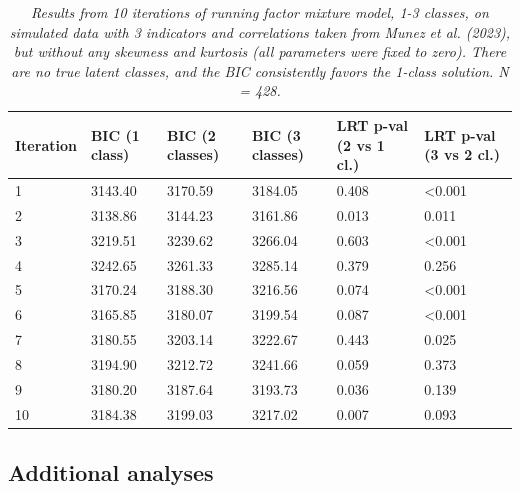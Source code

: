 \documentclass[letterpaper,11pt]{article}
\begin{document}
\begin{table}[htbp]
    \centering
    \label{tab:iterationResults}
    \caption{\newline \textit{Results from 10 iterations of running factor mixture model, 1-3 classes, on simulated data with 3 indicators and correlations taken from Munez et al. (2023), but without any skewness and kurtosis (all parameters were fixed to zero). There are no true latent classes, and the BIC consistently favors the 1-class solution. N = 428.}}
    \begin{tabularx}{\textwidth}{XXXXXX}
       \toprule
        \textbf{Iteration} & \textbf{BIC \newline(1 class)} & \textbf{BIC \newline(2 classes)} & \textbf{BIC \newline(3 classes)} & \textbf{LRT p-val \newline(2 vs 1 cl.)} & \textbf{LRT p-val \newline(3 vs 2 cl.)}  \\
        \midrule
        1 & 3143.40 & 3170.59 & 3184.05 &  0.408 & \textless 0.001 \\
        2 & 3138.86 & 3144.23 & 3161.86 &  0.013 & 0.011 \\
        3 & 3219.51 & 3239.62 & 3266.04 &  0.603 & \textless 0.001 \\
        4 & 3242.65 & 3261.33 & 3285.14 &  0.379 & 0.256 \\
        5 & 3170.24 & 3188.30 & 3216.56 &  0.074 & \textless 0.001 \\
        6 & 3165.85 & 3180.07 & 3199.54 &  0.087 & \textless 0.001 \\
        7 & 3180.55 & 3203.14 & 3222.67 &  0.443 & 0.025 \\
        8 & 3194.90 & 3212.72 & 3241.66 &  0.059 & 0.373 \\
        9 & 3180.20 & 3187.64 & 3193.73 & 0.036 & 0.139 \\
       10 & 3184.38 & 3199.03 & 3217.02 &  0.007 & 0.093 \\
        \bottomrule
    \end{tabularx}
\end{table}


\titleformat{\subsection}[hang]{\normalfont\bfseries}{\thesubsection}{1em}{}
\subsection*{Additional analyses}
\end{document}
